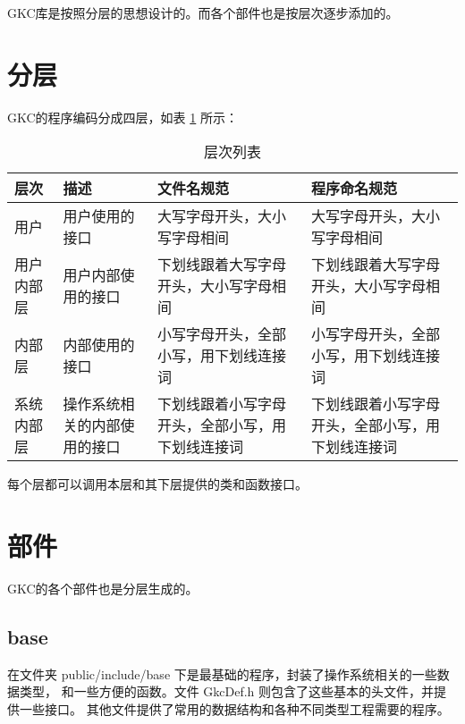 ﻿%
%


GKC库是按照分层的思想设计的。而各个部件也是按层次逐步添加的。

\section{分层}

GKC的程序编码分成四层，如表 \ref{tab:a-gkc:layers} 所示：

\begin{table}[h]
  \centering
  \caption{层次列表}\label{tab:a-gkc:layers}
\begin{tabular}{|l|p{3cm}|p{3cm}|p{3cm}|}
  \hline
  \textbf{层次} &  \textbf{描述} & \textbf{文件名规范} &  \textbf{程序命名规范}  \\
  \hline\hline
  用户  &  用户使用的接口  & 大写字母开头，大小写字母相间  &  大写字母开头，大小写字母相间  \\
  \hline
  用户内部层 & 用户内部使用的接口  & 下划线跟着大写字母开头，大小写字母相间  &  下划线跟着大写字母开头，大小写字母相间  \\
  \hline
  内部层  & 内部使用的接口  & 小写字母开头，全部小写，用下划线连接词  & 小写字母开头，全部小写，用下划线连接词  \\
  \hline
  系统内部层  & 操作系统相关的内部使用的接口  & 下划线跟着小写字母开头，全部小写，用下划线连接词  & 下划线跟着小写字母开头，全部小写，用下划线连接词  \\
  \hline
\end{tabular}

\end{table}

每个层都可以调用本层和其下层提供的类和函数接口。

\section{部件}

GKC的各个部件也是分层生成的。

\subsection{base}

在文件夹 public/include/base 下是最基础的程序，封装了操作系统相关的一些数据类型，
和一些方便的函数。文件 GkcDef.h 则包含了这些基本的头文件，并提供一些接口。
其他文件提供了常用的数据结构和各种不同类型工程需要的程序。

